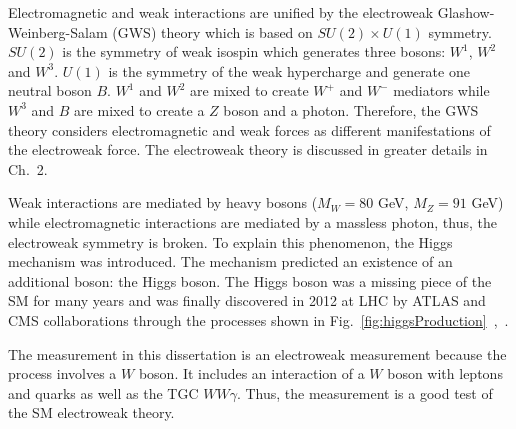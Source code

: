 Electromagnetic and weak interactions are unified by the electroweak Glashow-Weinberg-Salam (GWS) theory which is based on $SU(2) \times U(1)$ symmetry. $SU(2)$ is the symmetry of weak isospin which generates three bosons: $W^1$, $W^2$ and $W^3$. $U(1)$ is the symmetry of the weak hypercharge and generate one neutral boson $B$. $W^1$ and $W^2$ are mixed to create $W^+$ and $W^-$ mediators while $W^3$ and $B$ are mixed to create a $Z$ boson and a photon. Therefore, the GWS theory considers electromagnetic and weak forces as different manifestations of the electroweak force. The electroweak theory is discussed in greater details in Ch.~2.

Weak interactions are mediated by heavy bosons ($M_W=80$ GeV, $M_Z=91$ GeV) while electromagnetic interactions are mediated by a massless photon, thus, the electroweak symmetry is broken. To explain this phenomenon, the Higgs mechanism was introduced. The mechanism predicted an existence of an additional boson: the Higgs boson. The Higgs boson was a missing piece of the SM for many years and was finally discovered in 2012 at LHC by ATLAS and CMS collaborations through the processes shown in Fig.~\ref{fig:higgsProduction}~\cite{ref_HiggsPaperCMS},~\cite{ref_HiggsPaperATLAS}.

The measurement in this dissertation is an electroweak measurement because the process involves a $W$ boson. It includes an interaction of a $W$ boson with leptons and quarks as well as the TGC $WW\gamma$. Thus, the measurement is a good test of the SM electroweak theory. 


